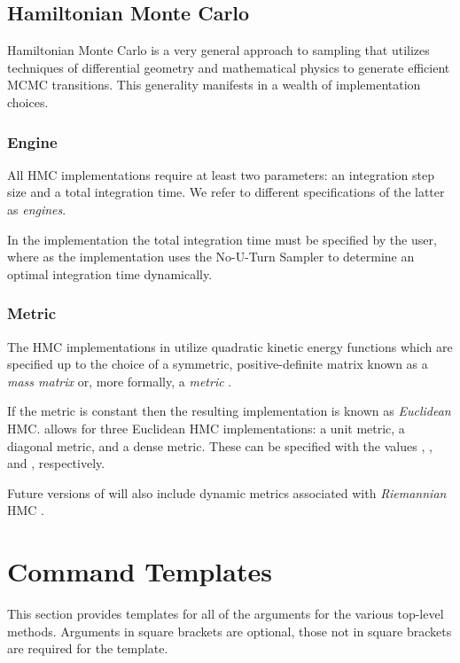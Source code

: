 \subsection{Hamiltonian Monte Carlo}

Hamiltonian Monte Carlo is a very general approach to sampling that
utilizes techniques of differential geometry and mathematical physics
to generate efficient MCMC transitions.  This generality manifests in
a wealth of implementation choices.

\subsubsection{Engine}

All HMC implementations require at least two parameters: an
integration step size and a total integration time.  We refer to
different specifications of the latter as \textit{engines}.

In the  implementation the total integration time
must be specified by the user, where as the 
implementation uses the No-U-Turn Sampler to determine
an optimal integration time dynamically. 

\subsubsection{Metric}

The HMC implementations in \Stan utilize quadratic kinetic energy
functions which are specified up to the choice of a symmetric,
positive-definite matrix known as a \textit{mass matrix} or, more
formally, a \textit{metric} \citep{Betancourt-Stein:2011}.

If the metric is constant then the resulting implementation is known
as \textit{Euclidean} HMC.  \Stan allows for three Euclidean HMC
implementations: a unit metric, a diagonal metric, and a dense
metric.  These can be specified with the values ,
, and , respectively.

Future versions of \Stan will also include dynamic metrics associated
with \textit{Riemannian} HMC \citep{GirolamiCalderhead:2011, Betancourt:2012}.


\section{Command Templates}

This section provides templates for all of the arguments for the
various top-level methods.  Arguments in square brackets are optional,
those not in square brackets are required for the template.

